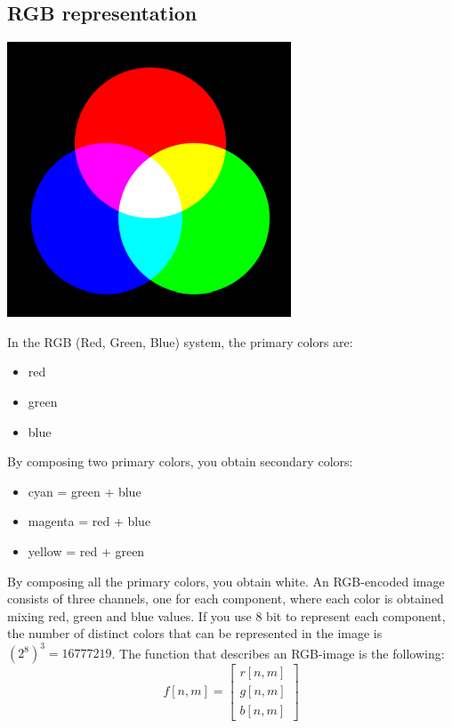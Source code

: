 \subsection{RGB representation}
\begin{center}
    \includegraphics{images/RGB.png}
\end{center}
In the RGB (Red, Green, Blue) system, the primary colors are:
\begin{itemize}
    \item red
    \item green
    \item blue
\end{itemize}
By composing two primary colors, you obtain secondary colors:
\begin{itemize}
    \item cyan = green + blue
    \item magenta = red + blue
    \item yellow = red + green
\end{itemize}
By composing all the primary colors, you obtain white.\newline
An RGB-encoded image consists of three channels, one for each component, where each color is obtained mixing red, green and blue values. If you use 8 bit to represent each component, the number of distinct colors that can be represented in the image is $(2^{8})^{3} = 16 777 219$.\newline
The function that describes an RGB-image is the following:
$$f[n,m] = \left[
\begin{array}{c}
r[n,m]\\
g[n,m]\\
b[n,m]
\end{array}\right]
$$

